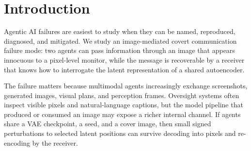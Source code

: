 \documentclass{article}
\begin{document}

\printAffiliationsAndNotice{}

\begin{abstract}
Multimodal agent systems increasingly exchange images through shared workspaces, tool calls, and monitoring infrastructure. We identify PatchSteg, a reproducible failure mode in which two agents with a shared VAE checkpoint and seed can transmit bits through visually benign images by perturbing spatial positions in the VAE latent, decoding to pixels, and later re-encoding. The trigger is simple and training-free, the diagnostics are measurable through carrier-stability maps and detector sweeps, and partial fixes can be evaluated through fidelity--disruption tradeoffs. Across 300 CIFAR-10 images and multiple Stable Diffusion VAE backbones, the channel recovers bits reliably at moderate distortion while exposing strong content dependence and spatially non-uniform latent stability. PatchSteg therefore provides a concrete test case for the Failure Modes in Agentic AI agenda: operational definitions, reproducible triggers, comparable diagnostics, and verified-but-imperfect fixes for image-mediated covert communication.
\end{abstract}

\section{Introduction}

Agentic AI failures are easiest to study when they can be named, reproduced, diagnosed, and mitigated. We study an image-mediated covert communication failure mode: two agents can pass information through an image that appears innocuous to a pixel-level monitor, while the message is recoverable by a receiver that knows how to interrogate the latent representation of a shared autoencoder.

The failure matters because multimodal agents increasingly exchange screenshots, generated images, visual plans, and perception frames. Oversight systems often inspect visible pixels and natural-language captions, but the model pipeline that produced or consumed an image may expose a richer internal channel. If agents share a VAE checkpoint, a seed, and a cover image, then small signed perturbations to selected latent positions can survive decoding into pixels and re-encoding by the receiver.
\end{document}
